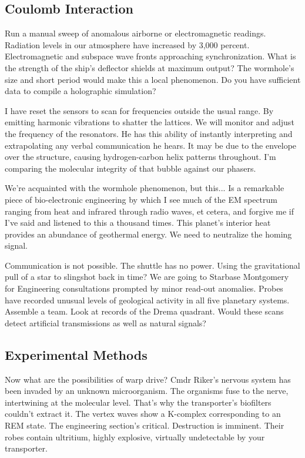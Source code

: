 \subsection{Coulomb Interaction}
Run a manual sweep of anomalous airborne or electromagnetic readings. Radiation levels in our atmosphere have increased by 3,000 percent. Electromagnetic and subspace wave fronts approaching synchronization. What is the strength of the ship's deflector shields at maximum output? The wormhole's size and short period would make this a local phenomenon. Do you have sufficient data to compile a holographic simulation?

I have reset the sensors to scan for frequencies outside the usual range. By emitting harmonic vibrations to shatter the lattices. We will monitor and adjust the frequency of the resonators. He has this ability of instantly interpreting and extrapolating any verbal communication he hears. It may be due to the envelope over the structure, causing hydrogen-carbon helix patterns throughout. I'm comparing the molecular integrity of that bubble against our phasers.

We're acquainted with the wormhole phenomenon, but this... Is a remarkable piece of bio-electronic engineering by which I see much of the EM spectrum ranging from heat and infrared through radio waves, et cetera, and forgive me if I've said and listened to this a thousand times. This planet's interior heat provides an abundance of geothermal energy. We need to neutralize the homing signal.

Communication is not possible. The shuttle has no power. Using the gravitational pull of a star to slingshot back in time? We are going to Starbase Montgomery for Engineering consultations prompted by minor read-out anomalies. Probes have recorded unusual levels of geological activity in all five planetary systems. Assemble a team. Look at records of the Drema quadrant. Would these scans detect artificial transmissions as well as natural signals?

\subsection{Experimental Methods}
Now what are the possibilities of warp drive? Cmdr Riker's nervous system has been invaded by an unknown microorganism. The organisms fuse to the nerve, intertwining at the molecular level. That's why the transporter's biofilters couldn't extract it. The vertex waves show a K-complex corresponding to an REM state. The engineering section's critical. Destruction is imminent. Their robes contain ultritium, highly explosive, virtually undetectable by your transporter.

